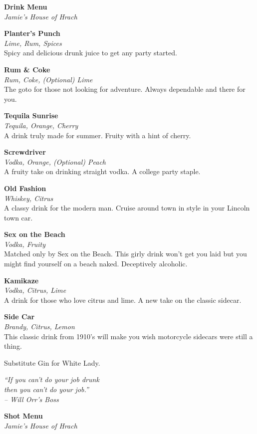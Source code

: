 \documentclass[12pt]{article}
\newcommand{\drink}[3]{
    \begin{center}
        \noindent\large \textbf{#1}\\
        \small \textit{#2}\\
        \normalsize #3\\
        \vspace{10 mm}
    \end{center}
}
\begin{document}
   \begin{center}
       \LARGE \textbf{Drink Menu} \\
       \small \textit{Jamie's House of Hrach} \\
       \hrulefill
   \end{center}

   \begin{multicols}{2}
   \drink{Planter's Punch}{Lime, Rum, Spices}{
         Spicy and delicious drunk juice to get any party started.
   }

   \drink{Rum \& Coke}{Rum, Coke, (Optional) Lime}{
      The goto for those not looking for adventure.
      Always dependable and there for you.
   }

   \drink{Tequila Sunrise}{Tequila, Orange, Cherry}{
      A drink truly made for summer. Fruity with a hint of cherry.
   }

   \drink{Screwdriver}{Vodka, Orange, (Optional) Peach}{
      A fruity take on drinking straight vodka. A college party staple.
   }

   \columnbreak

   \drink{Old Fashion}{Whiskey, Citrus}{
      A classy drink for the modern man. Cruise around town in style in your
      Lincoln town car.
   }

   \drink{Sex on the Beach}{Vodka, Fruity}{
      Matched only by Sex on the Beach. This girly drink won't get you laid
      but you might find yourself on a beach naked. Deceptively alcoholic.
   }

   \drink{Kamikaze}{Vodka, Citrus, Lime}{
      A drink for those who love citrus and lime. A new take on the classic sidecar.
   }

   \drink{Side Car}{Brandy, Citrus, Lemon}{
      This classic drink from 1910's will make you wish motorcycle sidecars
      were still a thing.

      Substitute Gin for White Lady.
   }

   \end{multicols}

   \vfill
   \begin{center}
      \noindent\textit{
          ``If you can't do your job drunk \\
          then you can't do your job.'' \\
          -- Will Orr's Boss
      }
   \end{center}

   \clearpage

   \begin{center}
      \LARGE \textbf{Shot Menu} \\
      \small \textit{Jamie's House of Hrach} \\
      \hrulefill
      \end{center}
\end{document}
